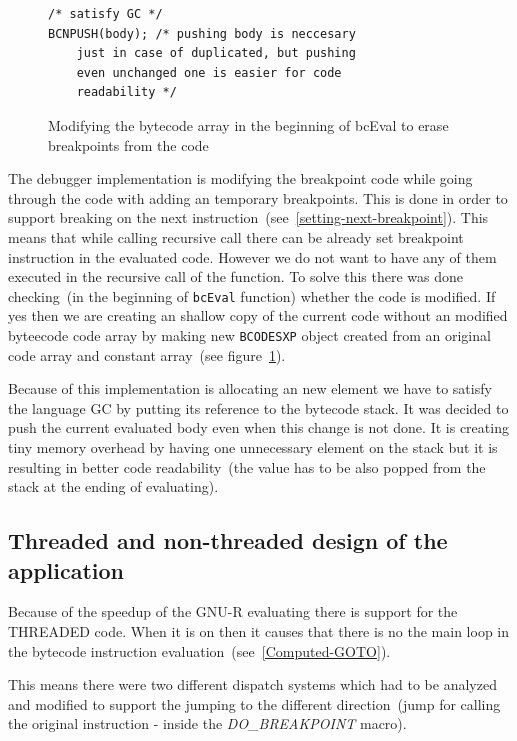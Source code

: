 \documentclass[thesis=M,english]{FITthesis}[2018/10/20]
\newcommand{\code}[1]{\texttt{#1}}
\begin{document}
{\begin{figure}[h]
\begin{lstlisting}
/* satisfy GC */
BCNPUSH(body); /* pushing body is neccesary
	just in case of duplicated, but pushing
	even unchanged one is easier for code
    readability */

\end{lstlisting}
	\caption{Modifying the bytecode array in the beginning of bcEval to erase breakpoints from the code}\label{fig:erase-breakpoints-in-bceval}
\end{figure}

The debugger implementation is modifying the breakpoint code while going through the code with adding an temporary breakpoints. This is done in order to support breaking on the next instruction~(see~\ref{setting-next-breakpoint}). This means that while calling recursive call there can be already set breakpoint instruction in the evaluated code. However we do not want to have any of them executed in the recursive call of the function. To solve this there was done checking~(in the beginning of \code{bcEval} function) whether the code is modified. If yes then we are creating an shallow copy of the current code without an modified byteecode code array by making new \code{BCODESXP} object created from an original code array and constant array~(see figure~\ref{fig:erase-breakpoints-in-bceval}).

Because of this implementation is allocating an new element we have to satisfy the language GC by putting its reference to the bytecode stack. It was decided to push the current evaluated body even when this change is not done. It is creating tiny memory overhead by having one unnecessary element on the stack but it is resulting in better code readability~(the value has to be also popped from the stack at the ending of evaluating).


\subsection{Threaded and non-threaded design of the application}\label{threaded-and-non-threaded-design}

Because of the speedup of the GNU-R evaluating there is support for the THREADED code. When it is on then it causes that there is no the main loop in the bytecode instruction evaluation~(see~\ref{Computed-GOTO}).

This means there were two different dispatch systems which had to be analyzed and modified to support the jumping to the different direction~(jump for calling the original instruction - inside the \textit{DO{\_}BREAKPOINT} macro).

}
\end{document}
